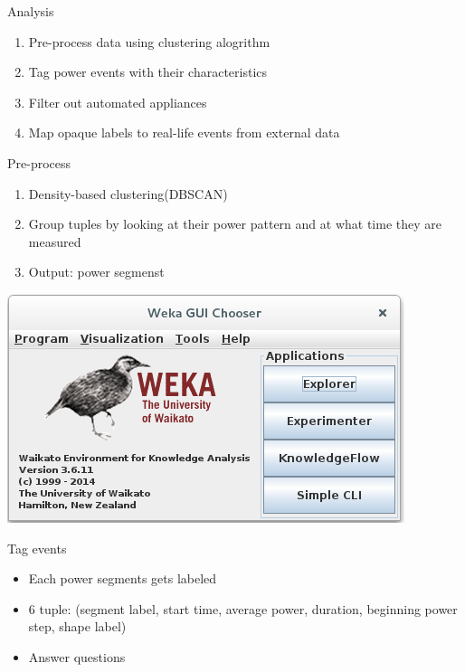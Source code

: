 \documentclass[10pt]{beamer}
\begin{document}
\begin{frame}{Analysis}
  \begin{enumerate}
    \itemsep2em 
  \item Pre-process data using clustering alogrithm
  \item Tag power events with their characteristics
  \item Filter out automated appliances
  \item Map opaque labels to real-life events from external data
  \end{enumerate}
\end{frame}

\begin{frame}{Pre-process}
  \begin{enumerate}
  \item Density-based clustering(DBSCAN)
  \item Group tuples by looking at their power pattern and at what time they are measured
  \item Output: power segmenst
  \end{enumerate}
  \begin{center}
  \includegraphics[scale=.3]{graphics/weka.png}   
  \end{center}
\end{frame}

\begin{frame}{Tag events}
  \begin{itemize}
  \item Each power segments gets labeled
  \item 6 tuple: (segment label, start time, average power, duration, beginning power step, shape label)
  \item Answer questions
  \end{itemize}
\end{frame}
\end{document}
